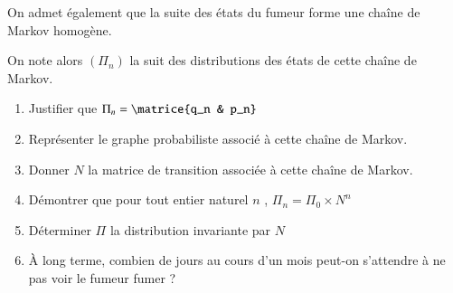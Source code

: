 \documentclass[oneside,12pt]{article}
\begin{document}
On admet également que la suite des états du fumeur forme une chaîne de Markov homogène.

On note alors $(\Pi_n)$ la suit des distributions des états de cette chaîne de Markov.
\begin{enumerate}
    \item Justifier que $\Pi_n=\matrice{q_n & p_n}$
    \item Représenter le graphe probabiliste associé à cette chaîne de Markov.
    \item Donner $N$ la matrice de transition associée à cette chaîne de Markov.
    \item Démontrer que pour tout entier naturel $n$ , $\Pi_n=\Pi_0\times N^n$
    \item Déterminer $\Pi$ la distribution invariante par $N$
    \item À long terme, combien de jours au cours d'un mois peut-on s'attendre à ne pas voir le fumeur fumer ?
\end{enumerate}
\end{document}
